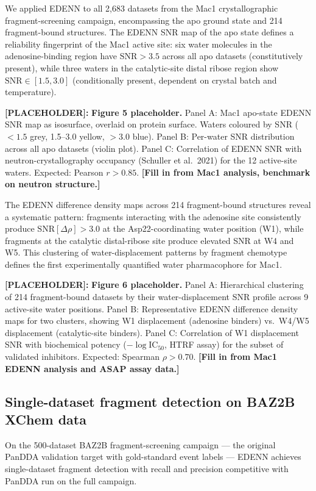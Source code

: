 \documentclass[10pt,twocolumn]{article}
\newcommand{\placeholder}[1]{%
  \begin{mdframed}[
    linecolor=placeholder,linewidth=1pt,
    backgroundcolor=red!5,
    innertopmargin=6pt,innerbottommargin=6pt,
    innerleftmargin=8pt,innerrightmargin=8pt]
  \small\color{placeholder}\textbf{[PLACEHOLDER]:} #1
  \end{mdframed}
}
\newcommand{\rhodiff}{\Delta\rho}
\newcommand{\SNR}{\mathrm{SNR}}
\begin{document}
We applied EDENN to all 2,683 datasets from the Mac1
crystallographic fragment-screening campaign, encompassing
the apo ground state and 214 fragment-bound structures.
The EDENN SNR map of the apo state defines a reliability
fingerprint of the Mac1 active site: six water molecules in
the adenosine-binding region have $\SNR > 3.5$ across all
apo datasets (constitutively present), while three waters in
the catalytic-site distal ribose region show
$\SNR \in [1.5, 3.0]$ (conditionally present, dependent on
crystal batch and temperature).

\placeholder{
\textbf{Figure 5 placeholder.}
Panel A: Mac1 apo-state EDENN SNR map as isosurface, overlaid
on protein surface.  Waters coloured by SNR ($<1.5$ grey,
1.5--3.0 yellow, $>3.0$ blue).
Panel B: Per-water SNR distribution across all apo datasets
(violin plot).
Panel C: Correlation of EDENN SNR with neutron-crystallography
occupancy (Schuller et al.\ 2021) for the 12 active-site waters.
Expected: Pearson $r > 0.85$.
\textbf{[Fill in from Mac1 analysis, benchmark on neutron structure.]}
}

The EDENN difference density maps across 214 fragment-bound
structures reveal a systematic pattern: fragments interacting
with the adenosine site consistently produce
$\SNR[\rhodiff] > 3.0$ at the Asp22-coordinating water position
(W1), while fragments at the catalytic distal-ribose site produce
elevated SNR at W4 and W5.
This clustering of water-displacement patterns by fragment
chemotype defines the first experimentally quantified water
pharmacophore for Mac1.

\placeholder{
\textbf{Figure 6 placeholder.}
Panel A: Hierarchical clustering of 214 fragment-bound datasets
by their water-displacement SNR profile across 9 active-site
water positions.
Panel B: Representative EDENN difference density maps for two
clusters, showing W1 displacement (adenosine binders) vs.\
W4/W5 displacement (catalytic-site binders).
Panel C: Correlation of W1 displacement SNR with biochemical
potency ($-\log\mathrm{IC}_{50}$, HTRF assay) for the subset of
validated inhibitors.
Expected: Spearman $\rho > 0.70$.
\textbf{[Fill in from Mac1 EDENN analysis and ASAP assay data.]}
}

\subsection{Single-dataset fragment detection on BAZ2B XChem data}

On the 500-dataset BAZ2B fragment-screening campaign — the original
PanDDA validation target with gold-standard event labels — EDENN
achieves single-dataset fragment detection with recall and precision
competitive with PanDDA run on the full campaign.
\end{document}
